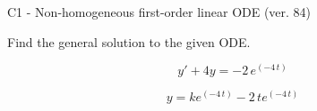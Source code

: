 \begin{exercise}
  \begin{exerciseTitle}C1 - Non-homogeneous first-order linear ODE (ver. 84)\end{exerciseTitle}
  \begin{exerciseStatement}
    
Find the general solution to the given ODE.

    
\[y'+4y= -2 \, e^{\left(-4 \, t\right)}\]

  \end{exerciseStatement}
  \begin{exerciseAnswer}
    
\[y= k e^{\left(-4 \, t\right)} - 2 \, t e^{\left(-4 \, t\right)}\]

  \end{exerciseAnswer}
\end{exercise}
